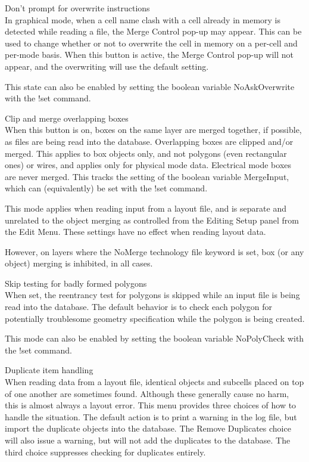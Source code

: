\begin{description}
\item{\cb Don't prompt for overwrite instructions}\\
In graphical mode, when a cell name clash with a cell already in
memory is detected while reading a file, the {\cb Merge Control}
pop-up may appear.  This can be used to change whether or not to
overwrite the cell in memory on a per-cell and per-mode basis.  When
this button is active, the {\cb Merge Control} pop-up will not appear,
and the overwriting will use the default setting.

This state can also be enabled by setting the boolean variable {\et
NoAskOverwrite} with the {\cb !set} command.

\item{\cb Clip and merge overlapping boxes}\\
When this button is on, boxes on the same layer are merged together,
if possible, as files are being read into the database.  Overlapping
boxes are clipped and/or merged.  This applies to box objects only,
and not polygons (even rectangular ones) or wires, and applies only
for physical mode data.  Electrical mode boxes are never merged.  This
tracks the setting of the boolean variable {\et MergeInput}, which can
(equivalently) be set with the {\cb !set} command.

This mode applies when reading input from a layout file, and is
separate and unrelated to the object merging as controlled from the
{\cb Editing Setup} panel from the {\cb Edit Menu}.  These settings
have no effect when reading layout data.

However, on layers where the {\vt NoMerge} technology file keyword is
set, box (or any object) merging is inhibited, in all cases.

\item{\cb Skip testing for badly formed polygons}\\
When set, the reentrancy test for polygons is skipped while an input
file is being read into the database.  The default behavior is to
check each polygon for potentially troublesome geometry specification
while the polygon is being created.

This mode can also be enabled by setting the boolean variable {\et
NoPolyCheck} with the {\cb !set} command.

\item{\cb Duplicate item handling}\\
When reading data from a layout file, identical objects and subcells
placed on top of one another are sometimes found.  Although these
generally cause no harm, this is almost always a layout error.  This
menu provides three choices of how to handle the situation.  The
default action is to print a warning in the log file, but import the
duplicate objects into the database.  The {\cb Remove Duplicates}
choice will also issue a warning, but will not add the duplicates to
the database.  The third choice suppresses checking for duplicates
entirely.


\end{description}
